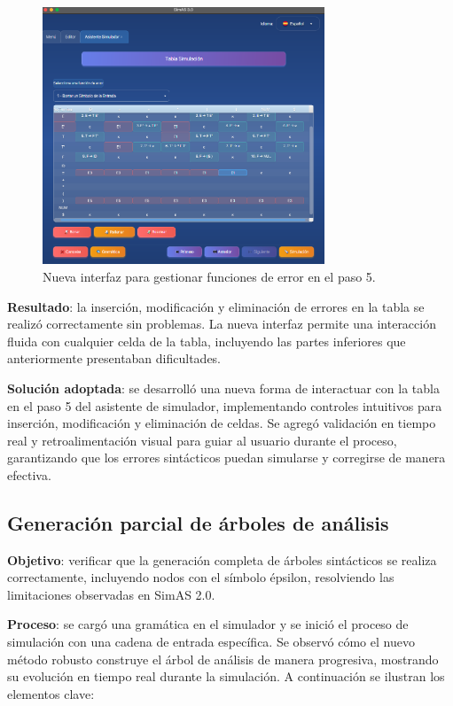 \needspace{6cm}
\begin{figure}[H]
  \centering
  \includegraphics[width=0.75\textwidth]{figuras2/pruebas/simulador/func_errores.png}
  \caption{Nueva interfaz para gestionar funciones de error en el paso 5.}
\end{figure}

\textbf{Resultado}: la inserción, modificación y eliminación de errores en la tabla se realizó correctamente sin problemas. La nueva interfaz permite una interacción fluida con cualquier celda de la tabla, incluyendo las partes inferiores que anteriormente presentaban dificultades.
\medskip

\textbf{Solución adoptada}: se desarrolló una nueva forma de interactuar con la tabla en el paso 5 del asistente de simulador, implementando controles intuitivos para inserción, modificación y eliminación de celdas. Se agregó validación en tiempo real y retroalimentación visual para guiar al usuario durante el proceso, garantizando que los errores sintácticos puedan simularse y corregirse de manera efectiva.

\subsection{Generación parcial de árboles de análisis}

\textbf{Objetivo}: verificar que la generación completa de árboles sintácticos se realiza correctamente, incluyendo nodos con el símbolo épsilon, resolviendo las limitaciones observadas en SimAS 2.0.
\medskip

\textbf{Proceso}: se cargó una gramática en el simulador y se inició el proceso de simulación con una cadena de entrada específica. Se observó cómo el nuevo método robusto construye el árbol de análisis de manera progresiva, mostrando su evolución en tiempo real durante la simulación. A continuación se ilustran los elementos clave:
\medskip

